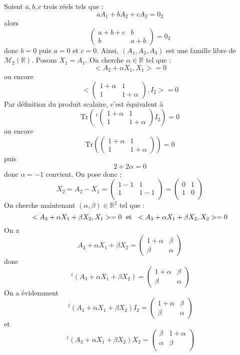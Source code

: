 \documentclass[a4paper,10pt]{report}
\begin{document}
\corr Soient $a,b,c$ trois réels tels que :
$$ a A_1+bA_2+cA_3= 0_2$$
alors 
$$ \begin{pmatrix}
a+b+c & b \\
b & a+b
\end{pmatrix}=0_2$$
donc $b=0$ puis $a=0$ et $c=0$. Ainsi, $(A_1,A_2,A_3)$ est une famille libre de $\mathcal{M}_2(\mathbb{R})$. Posons $X_1=A_1$. On cherche $\alpha \in \mathbb{R}$ tel que :
$$ <A_2+ \alpha X_1, X_1>=0$$
ou encore 
$$ <\begin{pmatrix}
1+ \alpha & 1 \\
1 & 1+ \alpha
\end{pmatrix}, I_2>=0$$
Par définition du produit scalaire, c'est équivalent à
$$ \textrm{Tr} \left( ~^t{\begin{pmatrix} 1+ \alpha & 1 \\
1 & 1+ \alpha
\end{pmatrix}} I_2 \right)=0$$
ou encore 
$$ \textrm{Tr} \left( \begin{pmatrix} 1+ \alpha & 1 \\
1 & 1+ \alpha
\end{pmatrix} \right)=0$$
puis
$$ 2+ 2 \alpha=0$$
donc $\alpha=-1$ convient. On pose donc :
$$ X_2 = A_2 - X_1 = \begin{pmatrix}
1-1 & 1 \\
1 & 1-1\\
\end{pmatrix}
 = \begin{pmatrix}
0 & 1 \\
1 & 0 \\
\end{pmatrix}$$
On cherche maintenant $(\alpha, \beta) \in \mathbb{R}^2$ tel que :
$$ <A_3+ \alpha X_1+ \beta X_2, X_1>=0 \; \hbox{ et } \; <A_3+ \alpha X_1+ \beta X_2, X_2>=0$$
On a 
$$ A_3+ \alpha X_1+ \beta X_2 = \begin{pmatrix}
1 + \alpha & \beta \\
\beta & \alpha
\end{pmatrix}$$
donc
$$ ~^t(A_3+ \alpha X_1+ \beta X_2)= \begin{pmatrix}
1 + \alpha & \beta \\
\beta & \alpha
\end{pmatrix}$$
On a évidemment
$$ ~^t(A_3+ \alpha X_1+ \beta X_2) I_2= \begin{pmatrix}
1 + \alpha & \beta \\
\beta & \alpha
\end{pmatrix}$$
et 
$$ ~^t(A_3+ \alpha X_1+ \beta X_2) X_2 = \begin{pmatrix}
\beta & 1 + \alpha \\
\alpha& \beta \\
\end{pmatrix}$$
\end{document}
